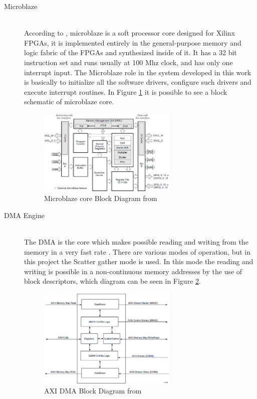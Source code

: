 \begin{description}

	\item[Microblaze] \hfill \\

  According to \cite{xilinx:ublaze}, microblaze is a soft processor core
  designed for Xilinx FPGAs, it is implemented entirely in the general-purpose
  memory and logic fabric of the FPGAs and synthesized inside of it. It has a 32
  bit instruction set and runs usually at 100 Mhz clock, and has only one
  interrupt input. The Microblaze role in the system developed in this work is
  basically to initialize all the software drivers, configure such drivers and
  execute interrupt routines. In Figure \ref{fig:mbbd} it is possible to see a
  block schematic of microblaze core.

  \begin{figure}[htbp]
    \centering
    \includegraphics[width=0.65\textwidth]{./figures/mb_bd}
    \caption{ Microblaze core Block Diagram from \cite{xilinx:ublaze}
    \label{fig:mbbd}}
  \end{figure}

	\item[DMA Engine] \hfill \\

  The DMA is the core which makes possible reading and writing from the memory
  in a very fast rate \cite{xilinx:axidma}. There are various modes of
  operation, but in this project the Scatter gather mode is used. In this mode
  the reading and writing is possible in a non-continuous memory addresses by
  the use of block descriptors, which diagram can be seen in Figure
  \ref{fig:dmabd}.

  \begin{figure}[htbp]
    \centering
    \includegraphics[width=0.65\textwidth]{./figures/dma_bd}
    \caption{ AXI DMA Block Diagram from \cite{xilinx:axidma}
    \label{fig:dmabd}}
  \end{figure}


\end{description}
